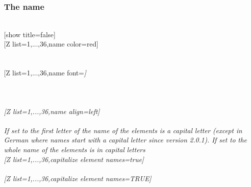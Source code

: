\vfill%
\subsubsection{\texorpdfstring{ The name}{The name}}\vspace{6pt}%
\\ [5pt][show title=false]%
\pgfPTstyle[show title=false]%
\\ [-1pt][Z list={1,...,36},name color=red]%
\\ [5pt]\makebox[\linewidth][c]{\scalebox{.6}{\pgfPT[Z list={1,...,36},name color=red]}}%
\\ [0pt]\pgfPTendoption%
\\ [5pt][Z list={1,...,36},name font=\string\itshape\string\tiny]%
\\ [5pt]\makebox[\linewidth][c]{\scalebox{.6}{\pgfPT[Z list={1,...,36},name font=\itshape\tiny]}}%
\\ [0pt]\pgfPTendoption%
\newpage\enlargethispage{\baselineskip}\ \\ [-32pt]%
\\ [5pt][Z list={1,...,36},name align=left]%
\\ [5pt]\makebox[\linewidth][c]{\scalebox{.6}{\pgfPT[Z list={1,...,36},name align=left]}}%
\\ [-5pt]\pgfPTendoption%
\label{option_capitalize element names}%
%
{If set to  the first letter of the name of the elements is a capital letter (except in German where names start with a capital letter since version 2.0.1). If set to  the whole name of the elements is in capital letters}%
\\ [5pt][Z list={1,...,36},capitalize element names=true]%
\\ [5pt]\makebox[\linewidth][c]{\scalebox{.6}{\pgfPT[Z list={1,...,36},capitalize element names=true]}}%
\\ [5pt][Z list={1,...,36},capitalize element names=TRUE]%
